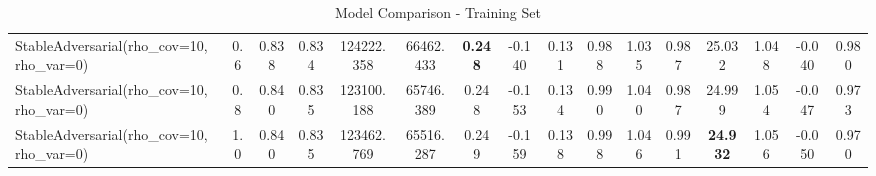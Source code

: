 \documentclass[11pt]{article}
\theoremstyle{plain}
\theoremstyle{definition}
\newcommand{\1}{\mathbf{1}}
\begin{document}
\begin{table}[!h]
{\begin{tabular}{lccccccccccccccc}
StableAdversarial(rho\_cov=10, rho\_var=0) & 0.6 & 0.838 & 0.834 & 124222.358 & 66462.433 & \textbf{0.248} & -0.140 & 0.131 & 0.988 & 1.035 & 0.987 & 25.032 & 1.048 & -0.040 & 0.980 \\
StableAdversarial(rho\_cov=10, rho\_var=0) & 0.8 & 0.840 & 0.835 & 123100.188 & 65746.389 & 0.248 & -0.153 & 0.134 & 0.990 & 1.040 & 0.987 & 24.999 & 1.054 & -0.047 & 0.973 \\
StableAdversarial(rho\_cov=10, rho\_var=0) & 1.0 & 0.840 & 0.835 & 123462.769 & 65516.287 & 0.249 & -0.159 & 0.138 & 0.998 & 1.046 & 0.991 & \textbf{24.932} & 1.056 & -0.050 & 0.970 \\
\bottomrule
\end{tabular}%
}
\caption{Model Comparison - Training Set}
\end{table}





\newpage 
\end{document}

